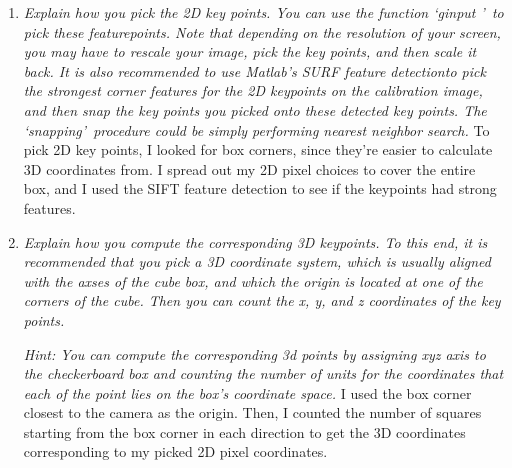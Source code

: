 \documentclass[11pt]{article}
\begin{document}
    \begin{enumerate}
        \item \textit{Explain how you pick the 2D key points. You can use the function \textquoteleft ginput
        \textquoteright\ to pick these featurepoints. Note that depending on the resolution of your screen, you may
        have to rescale your image, pick the key points, and then scale it back. It is also recommended to use Matlab’s
        SURF feature detectionto pick the strongest corner features for the 2D keypoints on the calibration image, and
        then snap the key points you picked onto these detected key points. The \textquoteleft snapping\textquoteright\
            procedure could be simply performing nearest neighbor search.}\newline
        To pick 2D key points, I looked for box corners, since they're easier to calculate 3D coordinates from. I
        spread out my 2D pixel choices to cover the entire box, and I used the SIFT feature detection to see if the
        keypoints had strong features.\newline
        \noindent{}\newline

        \item \textit{Explain how you compute the corresponding 3D keypoints. To this end, it is recommended that you
        pick a 3D coordinate system, which is usually aligned with the axses of the cube box, and which the origin is
        located at one of the corners of the cube. Then you can count the x, y, and z coordinates of the key points.}
        \par
        \textit{Hint: You can compute the corresponding 3d points by assigning xyz axis to the checkerboard box and
        counting the number of units for the coordinates that each of the point lies on the box’s coordinate space.}\newline
        I used the box corner closest to the camera as the origin.\newline
        Then, I counted the number of squares starting from the box corner in each direction to get the 3D
        coordinates corresponding to my picked 2D pixel coordinates.\newline


\end{enumerate}
\end{document}
